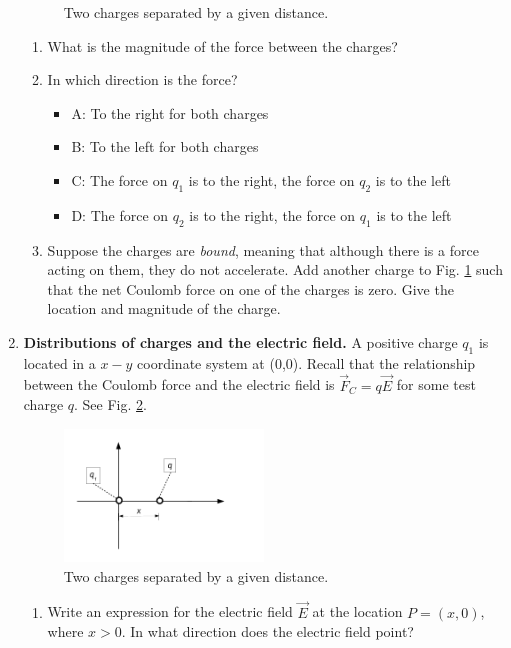 \documentclass[10pt]{article}
\begin{document}
\begin{enumerate}
\begin{figure}[hb]
\caption{\label{fig:fig1} Two charges separated by a given distance.}
\end{figure}
\begin{enumerate}
\item What is the magnitude of the force between the charges? \\ \vspace{2cm}
\item In which direction is the force?
\begin{itemize}
\item A: To the right for both charges
\item B: To the left for both charges
\item C: The force on $q_1$ is to the right, the force on $q_2$ is to the left
\item D: The force on $q_2$ is to the right, the force on $q_1$ is to the left
\end{itemize}
\item Suppose the charges are \textit{bound}, meaning that although there is a force acting on them, they do not accelerate.  Add another charge to Fig. \ref{fig:fig1} such that the net Coulomb force on one of the charges is zero.  Give the location and magnitude of the charge. \\ \vspace{2cm}
\end{enumerate}
\item \textbf{Distributions of charges and the electric field.} A positive charge $q_1$ is located in a $x-y$ coordinate system at (0,0).  Recall that the relationship between the Coulomb force and the electric field is $\vec{F}_C = q\vec{E}$ for some test charge $q$.  See Fig. \ref{fig:fig2}.
\begin{figure}[hb]
\centering
\includegraphics[width=0.5\textwidth]{midtermDiagram2.pdf}
\caption{\label{fig:fig2} Two charges separated by a given distance.}
\end{figure}
\begin{enumerate}
\item Write an expression for the electric field $\vec{E}$ at the location $P = (x,0)$, where $x>0$.  In what direction does the electric field point?  \\ \vspace{1cm}

\end{enumerate}
\end{enumerate}
\end{document}
